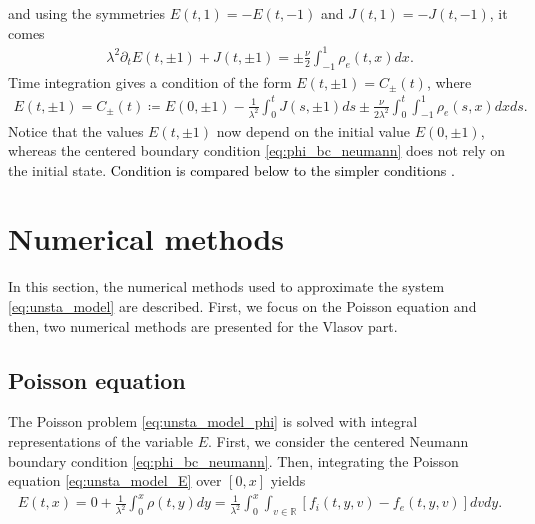 \documentclass{article}
\numberwithin{equation}{section}
\newcommand{\R}{\mathbb{R}}
\begin{document}
and using the symmetries $E(t,1)=-E(t, -1)$ and  $J(t,1)=-J(t, -1)$, it comes 
\begin{align}\label{eq:ampere_bc}
	\lambda^2\partial_t E(t, \pm 1) + J(t, \pm 1)  = \pm \frac{\nu}{2} \int_{-1}^1 \rho_e (t, x)dx.
\end{align}
Time integration gives a condition of the form $E(t,\pm 1) = C_{\pm}(t)$, where %
\begin{align}\label{eq:phi_bc_ampere}
	E(t,\pm 1) = C_{\pm} (t) \coloneqq E(0,\pm1) - \frac{1}{\lambda^2} \int_0^t J (s, \pm1) ds \pm \frac{\nu}{2 \lambda^2}\int_0^t  \int_{-1}^1 \rho_e (s, x) dx ds. 
\end{align}
Notice that the values $E(t,\pm 1)$ now depend on the initial value $E(0,\pm1)$, whereas the centered boundary condition \cref{eq:phi_bc_neumann} does not rely on the initial state. \textcolor{black}{Condition  is compared below to the simpler conditions .}


\section{Numerical methods}\label{sec:nummethods}
In this section, the numerical methods used to approximate the system \cref{eq:unsta_model} are described. 
First, we focus on the Poisson equation and  then, two numerical methods are presented for the Vlasov part. 

\subsection{Poisson equation}\label{ssec:poisson}
 The Poisson problem \cref{eq:unsta_model_phi} is solved with integral representations of the variable $E$.
First, we consider the centered Neumann boundary condition \cref{eq:phi_bc_neumann}. Then, integrating the Poisson equation \cref{eq:unsta_model_E} over $[0,x]$ yields
\begin{align}\label{eq:integral_representation_E_sym}
	E(t,x) = 0 + {\frac{1}{\lambda^2}} \int_0^x \rho(t,y) dy = {\frac{1}{\lambda^2}}\int_0^x \int_{v\in\R} [f_i(t,y,v) - f_e(t,y,v)] dv dy.
\end{align}
\end{document}
